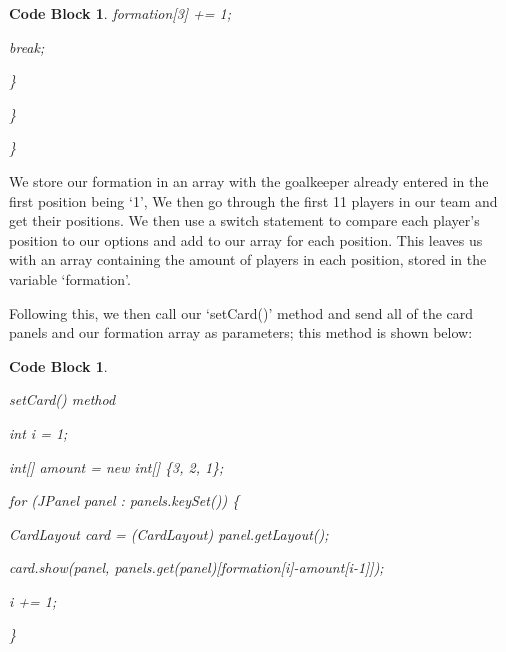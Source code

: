 \documentclass[12pt, a4paper, oneside]{book}
\newtheorem{codeblock}[theorem]{Code Block}
\numberwithin{equation}{section}
\begin{document}
\begin{codeblock}
  \hspace{\parindent}\hspace{\parindent}\hspace{\parindent}\hspace{\parindent}formation[3] += 1;

  \hspace{\parindent}\hspace{\parindent}\hspace{\parindent}\hspace{\parindent}break;

  \hspace{\parindent}\hspace{\parindent}\}

  \hspace{\parindent}\}

  \}

\end{codeblock}

We store our formation in an array with the goalkeeper already entered in the first position being `1', We then go through the first 11 players in our team and get their positions. We then use a switch statement to compare each player's position to our options and add to our array for each position. This leaves us with an array containing the amount of players in each position, stored in the variable `formation'.

Following this, we then call our `setCard()' method and send all of the card panels and our formation array as parameters; this method is shown below:

\begin{codeblock} \label{setCard method}

  setCard() method

  int i = 1;
  
  int[] amount = new int[] \{3, 2, 1\};
  
  for (JPanel panel : panels.keySet()) \{
  
  \hspace{\parindent}CardLayout card = (CardLayout) panel.getLayout();
  
  \hspace{\parindent}card.show(panel, panels.get(panel)[formation[i]-amount[i-1]]);
  
  \hspace{\parindent}i += 1;
  
  \}

\end{codeblock}
\end{document}
